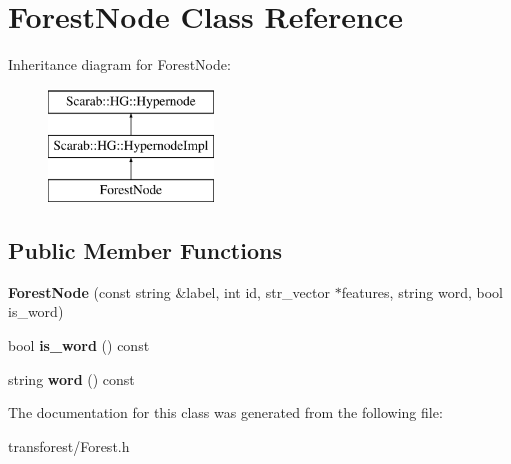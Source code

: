 \hypertarget{class_forest_node}{
\section{ForestNode Class Reference}
\label{class_forest_node}
}
Inheritance diagram for ForestNode:\begin{figure}[H]
\begin{center}
\leavevmode
\includegraphics[height=3cm]{class_forest_node}
\end{center}
\end{figure}
\subsection*{Public Member Functions}
\begin{DoxyCompactItemize}
\item 
\hypertarget{class_forest_node_aeeb649eef15a82d283ae728b0a44d183}{
{\bfseries ForestNode} (const string \&label, int id, str\_\-vector $\ast$features, string word, bool is\_\-word)}
\label{class_forest_node_aeeb649eef15a82d283ae728b0a44d183}

\item 
\hypertarget{class_forest_node_ab44af8003df7af0ce93b9b904301fb92}{
bool {\bfseries is\_\-word} () const }
\label{class_forest_node_ab44af8003df7af0ce93b9b904301fb92}

\item 
\hypertarget{class_forest_node_a18c00f9aae93bc963358e488f2cce308}{
string {\bfseries word} () const }
\label{class_forest_node_a18c00f9aae93bc963358e488f2cce308}

\end{DoxyCompactItemize}


The documentation for this class was generated from the following file:\begin{DoxyCompactItemize}
\item 
transforest/Forest.h\end{DoxyCompactItemize}
